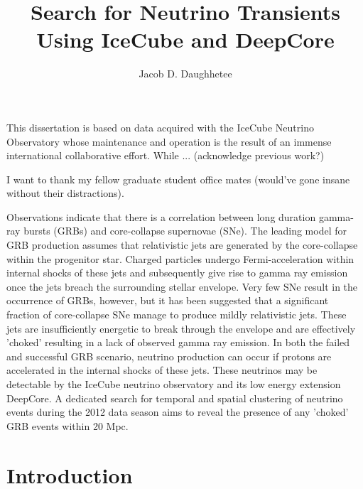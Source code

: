 \documentclass{gatech-thesis}
\title{Search for Neutrino Transients Using IceCube and DeepCore}
\author{Jacob D. Daughhetee}
\begin{document}

\begin{preliminary}
\begin{dedication}
\null\vfil
{\large
\begin{center}

\end{center}}
\vfil\null
\end{dedication}
\begin{preface}
This dissertation is based on data acquired with the IceCube Neutrino Observatory whose maintenance and operation is the result of an immense international collaborative effort. While ... (acknowledge previous work?)
\end{preface}
\begin{acknowledgements}
I want to thank my fellow graduate student office mates (would've gone insane without their distractions).
\end{acknowledgements}
\contents

\begin{summary}
Observations indicate that there is a correlation between long duration gamma-ray bursts (GRBs) and core-collapse supernovae (SNe).  The leading model for GRB production assumes that relativistic jets are generated by the core-collapse within the progenitor star.  Charged particles undergo Fermi-acceleration within internal shocks of these jets and subsequently give rise to gamma ray emission once the jets breach the surrounding stellar envelope.  Very few SNe result in the occurrence of GRBs, however,  but it has been suggested that a significant fraction of core-collapse SNe manage to produce mildly relativistic jets.  These jets are insufficiently energetic to break through the envelope and are effectively 'choked' resulting in a lack of observed gamma ray emission.  In both the failed and successful GRB scenario, neutrino production can occur if protons are accelerated in the internal shocks of these jets.  These neutrinos may be detectable by the IceCube neutrino observatory and its low energy extension DeepCore.  A dedicated search for temporal and spatial clustering of neutrino events during the 2012 data season aims to reveal the presence of any 'choked' GRB events within 20 Mpc.
\end{summary}

\end{preliminary}
\chapter{Introduction}
\end{document}
